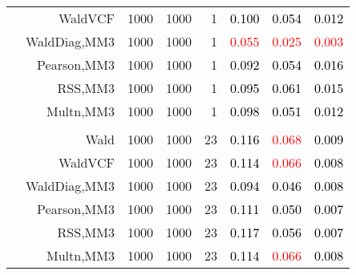 \documentclass[
]{article}
\begin{document}
\begin{table}[H]
{\begin{tabular}[t]{lrrrrrrr}
\hspace{1em} & WaldVCF & 1000 & 1000 & 1 & \textcolor{black}{0.100} & \textcolor{black}{0.054} & \textcolor{black}{0.012}\\

\hspace{1em} & WaldDiag,MM3 & 1000 & 1000 & 1 & \textcolor{red}{0.055} & \textcolor{red}{0.025} & \textcolor{red}{0.003}\\

\hspace{1em} & Pearson,MM3 & 1000 & 1000 & 1 & \textcolor{black}{0.092} & \textcolor{black}{0.054} & \textcolor{black}{0.016}\\

\hspace{1em} & RSS,MM3 & 1000 & 1000 & 1 & \textcolor{black}{0.095} & \textcolor{black}{0.061} & \textcolor{black}{0.015}\\

\hspace{1em} & Multn,MM3 & 1000 & 1000 & 1 & \textcolor{black}{0.098} & \textcolor{black}{0.051} & \textcolor{black}{0.012}\\
\cmidrule{1-8}
\addlinespace[0.3em]
\multicolumn{8}{l}{\textbf{3F 15V}}\\
\hspace{1em} & Wald & 1000 & 1000 & 23 & \textcolor{black}{0.116} & \textcolor{red}{0.068} & \textcolor{black}{0.009}\\

\hspace{1em} & WaldVCF & 1000 & 1000 & 23 & \textcolor{black}{0.114} & \textcolor{red}{0.066} & \textcolor{black}{0.008}\\

\hspace{1em} & WaldDiag,MM3 & 1000 & 1000 & 23 & \textcolor{black}{0.094} & \textcolor{black}{0.046} & \textcolor{black}{0.008}\\

\hspace{1em} & Pearson,MM3 & 1000 & 1000 & 23 & \textcolor{black}{0.111} & \textcolor{black}{0.050} & \textcolor{black}{0.007}\\

\hspace{1em} & RSS,MM3 & 1000 & 1000 & 23 & \textcolor{black}{0.117} & \textcolor{black}{0.056} & \textcolor{black}{0.007}\\

\hspace{1em} & Multn,MM3 & 1000 & 1000 & 23 & \textcolor{black}{0.114} & \textcolor{red}{0.066} & \textcolor{black}{0.008}\\
\bottomrule
\end{tabular}}
\endgroup{}
\end{table}
\end{document}
